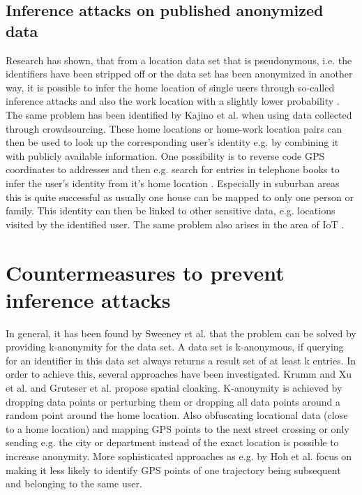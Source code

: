 \subsection{Inference attacks on published anonymized data}
Research has shown, that from a location data set that is pseudonymous, i.e. the identifiers have been stripped off or the data set has been anonymized in another way, it is possible to infer the home location of single users through so-called inference attacks \parencite{krumm, cellphone, privacy-home-work-pairs, hoh2006enhancing, twitter} and also the work location with a slightly lower probability \parencite{cellphone, privacy-home-work-pairs}. The same problem has been identified by Kajino et al. \parencite{crowdsourcing} when using data collected through crowdsourcing.
These home locations or home-work location pairs can then be used to look up the corresponding user's identity e.g. by combining it with publicly available information. One possibility is to reverse code GPS coordinates to addresses and then e.g. search for entries in telephone books to infer the user's identity from it's home location \parencite{krumm, privacy-home-work-pairs, hoh2006enhancing}. Especially in suburban areas this is quite successful as usually one house can be mapped to only one person or family. This identity can then be linked to other sensitive data, e.g. locations visited by the identified user. The same problem also arises in the area of IoT \parencite{iot, hoh2006enhancing}.

\section{Countermeasures to prevent inference attacks}
In general, it has been found by Sweeney et al. \parencite{k-anonymity} that the problem can be solved by providing k-anonymity for the data set. A data set is k-anonymous, if querying for an identifier in this data set always returns a result set of at least k entries.
In order to achieve this, several approaches have been investigated. Krumm \parencite{krumm} and Xu et al. \parencite{xu2018location} and Gruteser et al. \parencite{gruteser2003anonymous} propose spatial cloaking. K-anonymity is achieved by dropping data points or perturbing them or dropping all data points around a random point around the home location. Also obfuscating locational data (close to a home location) and mapping GPS points to the next street crossing or only sending e.g. the city or department instead of the exact location is possible to increase anonymity.
More sophisticated approaches as e.g. by Hoh et al. \parencite{time-to-confusion} focus on making it less likely to identify GPS points of one trajectory being subsequent and belonging to the same user.

